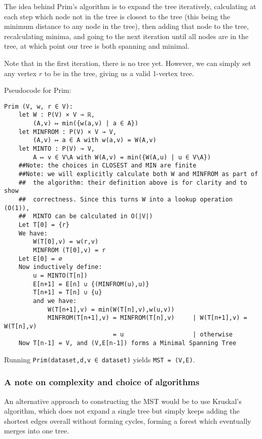 \documentclass[fleqn]{book}
\begin{document}
The idea behind Prim's algorithm is to expand the tree iteratively,
calculating at each step which node not in the tree is closest to the
tree (this being the minimum distance to any node in the tree), then
adding that node to the tree, recalculating minima, and going to the
next iteration until all nodes are in the tree, at which point our tree
is both spanning and minimal.

Note that in the first iteration, there is no tree yet. However, we can
simply set any vertex \(r\) to be in the tree, giving us a valid
1-vertex tree.

Pseudocode for Prim:

\begin{verbatim}
Prim (V, w, r ∈ V):
    let W : P(V) × V → ℝ,
        (A,v) ↦ min({w(a,v) | a ∈ A})
    let MINFROM : P(V) × V → V,
        (A,v) ↦ a ∈ A with w(a,v) = W(A,v)
    let MINTO : P(V) → V,
        A ↦ v ∈ V\A with W(A,v) = min({W(A,u) | u ∈ V\A})
    ##Note: the choices in CLOSEST and MIN are finite
    ##Note: we will explicitly calculate both W and MINFROM as part of
    ##  the algorithm: their definition above is for clarity and to show
    ##  correctness. Since this turns W into a lookup operation (O(1)),
    ##  MINTO can be calculated in O(|V|)
    Let T[0] = {r}
    We have:
        W(T[0],v) = w(r,v)
        MINFROM (T[0],v) = r
    Let E[0] = ∅
    Now inductively define:
        u = MINTO(T[n])
        E[n+1] = E[n] ∪ {(MINFROM(u),u)}
        T[n+1] = T[n] ∪ {u}
        and we have:
            W(T[n+1],v) = min(W(T[n],v),w(u,v))
            MINFROM(T[n+1],v) = MINFROM(T[n],v)     | W(T[n+1],v) = W(T[n],v)
                              = u                   | otherwise
    Now T[n-1] = V, and (V,E[n-1]) forms a Minimal Spanning Tree
\end{verbatim}

Running \texttt{Prim(dataset,d,v\ ∈\ dataset)} yields
\texttt{MST\ =\ (V,E)}.

\subsubsection{A note on complexity and choice of
algorithms}\label{a-note-on-complexity-and-choice-of-algorithms}

An alternative approach to constructing the MST would be to use
Kruskal's algorithm, which does not expand a single tree but simply
keeps adding the shortest edges overall without forming cycles, forming
a forest which eventually merges into one tree.
\end{document}
